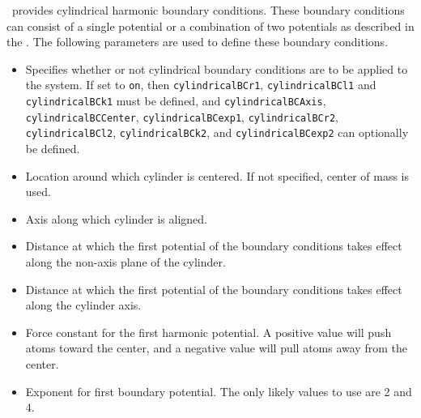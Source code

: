 \NAMD\ provides cylindrical harmonic boundary conditions.  These 
boundary conditions can consist of a single potential or a 
combination of two potentials as described in the \PG.  
The following parameters are used to define these boundary conditions.  

\begin{itemize}

\item
{}
{Specifies whether or not cylindrical boundary conditions 
are to be applied to the system.  If 
set to \verb!on!, then \verb!cylindricalBCr1!, \verb!cylindricalBCl1! and \verb!cylindricalBCk1! 
must be defined, and \verb!cylindricalBCAxis!, \verb!cylindricalBCCenter!, \verb!cylindricalBCexp1!, \verb!cylindricalBCr2!, \verb!cylindricalBCl2!,
\verb!cylindricalBCk2!, and \verb!cylindricalBCexp2! can optionally be 
defined.}

\item
{}
{Location around which cylinder is centered.  If not specified, center of mass is used.}

\item
{}
{Axis along which cylinder is aligned.}

\item
{}
{Distance at which the first potential of the boundary conditions takes
effect along the non-axis plane of the cylinder.}

\item
{}
{Distance at which the first potential of the boundary conditions takes
effect along the cylinder axis.}

\item
{}
{Force constant for the first harmonic potential.  A positive
value will push atoms toward the center, and a negative
value will pull atoms away from the center.}

\item
{}
{Exponent for first boundary potential.  The only likely values to
use are 2 and 4.}


\end{itemize}

